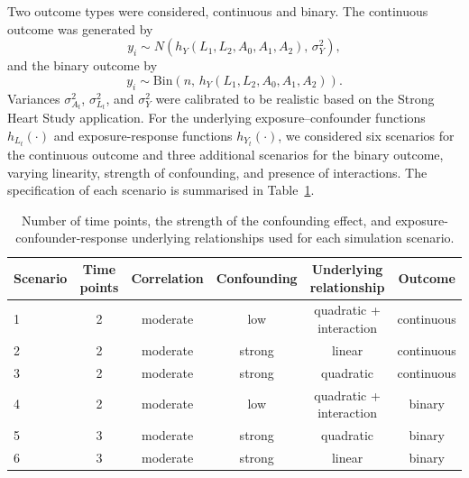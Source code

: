 Two outcome types were considered, continuous and binary. The continuous outcome was generated by
\begin{equation*}
    y_i \sim N\!\left(h_Y(L_1, L_2, A_0, A_1, A_2),\, \sigma^2_Y\right),
\end{equation*}
and the binary outcome by
\begin{equation*}
    y_i \sim \text{Bin}\!\left(n,\, h_Y(L_1, L_2, A_0, A_1, A_2)\right).
\end{equation*}
Variances $\sigma^2_{A_t}$, $\sigma^2_{L_t}$, and $\sigma^2_Y$ were calibrated to be realistic based on the Strong Heart Study application. For the underlying exposure--confounder functions $h_{L_t}(\cdot)$ and exposure-response functions $h_{Y_t}(\cdot)$, we considered six scenarios for the continuous outcome and three additional scenarios for the binary outcome, varying linearity, strength of confounding, and presence of interactions. The specification of each scenario is summarised in Table~\ref{tab:sim_scenarios}.

\begin{table}[h]
\centering
\caption{Number of time points, the strength of the confounding effect, and exposure-confounder-response underlying relationships used for each simulation scenario.}
\label{tab:sim_scenarios}
\begin{tabular}{lccccc}
\toprule
Scenario & Time points & Correlation & Confounding & Underlying relationship & Outcome \\
\midrule
1 & 2 & moderate & low    & quadratic + interaction & continuous \\
2 & 2 & moderate & strong & linear                  & continuous \\
3 & 2 & moderate & strong & quadratic               & continuous \\
4 & 2 & moderate & low    & quadratic + interaction & binary     \\
5 & 3 & moderate & strong & quadratic               & binary     \\
6 & 3 & moderate & strong & linear                  & binary     \\
\bottomrule
\end{tabular}
\end{table}

